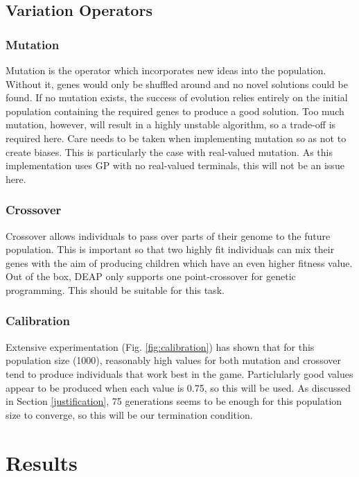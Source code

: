 \documentclass[12pt]{article}
\begin{document}
\subsection{Variation Operators}
\subsubsection{Mutation}
\label{mutation}
Mutation is the operator which incorporates new ideas into the population. Without it, genes would only be shuffled around and no novel solutions could be found. If no mutation exists, the success of evolution relies entirely on the initial population containing the required genes to produce a good solution. %
Too much mutation, however, will result in a highly unstable algorithm, so a trade-off is required here. Care needs to be taken when implementing mutation so as not to create biases. This is particularly the case with real-valued mutation. As this implementation uses GP with no real-valued terminals, this will not be an issue here.

\subsubsection{Crossover}
Crossover allows individuals to pass over parts of their genome to the future population. This is important so that two highly fit individuals can mix their genes with the aim of producing children which have an even higher fitness value. Out of the box, DEAP only supports one point-crossover for genetic programming. This should be suitable for this task. 

\subsubsection{Calibration}
Extensive experimentation (Fig. \ref{fig:calibration}) has shown that for this population size (1000), reasonably high values for both mutation and crossover tend to produce individuals that work best in the game. Particlularly good values appear to be produced when each value is 0.75, so this will be used. As discussed in Section \ref{justification}, 75 generations seems to be enough for this population size to converge, so this will be our termination condition.

\section{Results} %
\end{document}
